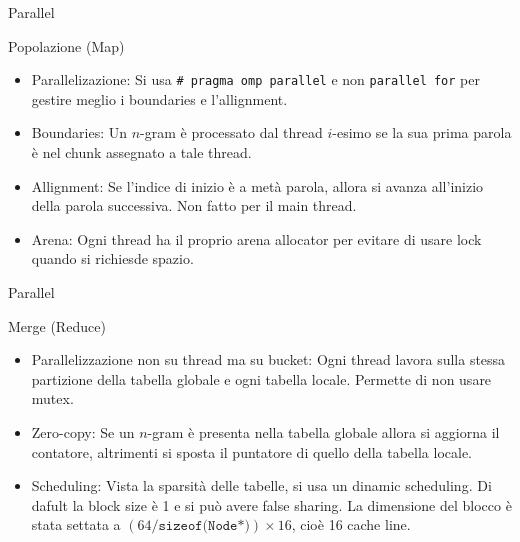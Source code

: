 \begin{frame}{Parallel}
    \begin{block}{Popolazione (Map)}
        \begin{itemize}
            \item Parallelizazione: Si usa \texttt{\# pragma omp parallel} e non \texttt{parallel for} per gestire meglio i boundaries e l'allignment.
            \item Boundaries: Un $n$-gram è processato dal thread $i$-esimo se la sua prima parola è nel chunk assegnato a tale thread.
            \item Allignment: Se l'indice di inizio è a metà parola, allora si avanza all'inizio della parola successiva. Non fatto per il main thread.
            \item Arena: Ogni thread ha il proprio arena allocator per evitare di usare lock quando si richiesde spazio.
        \end{itemize}
    \end{block}
\end{frame}

\begin{frame}{Parallel}
    \begin{block}{Merge (Reduce)}
        \begin{itemize}
            \item Parallelizzazione non su thread ma su bucket: Ogni thread lavora sulla stessa partizione della tabella globale e ogni tabella locale. Permette di non usare mutex.
            \item Zero-copy: Se un $n$-gram è presenta nella tabella globale allora si aggiorna il contatore, altrimenti si sposta il puntatore di quello della tabella locale.
            \item Scheduling: Vista la sparsità delle tabelle, si usa un dinamic scheduling. Di dafult la block size è 1 e si può avere false sharing. La dimensione del blocco è stata settata a $(64/\texttt{sizeof(Node*)})\times16$, cioè 16 cache line.
        \end{itemize}
    \end{block}
\end{frame}
